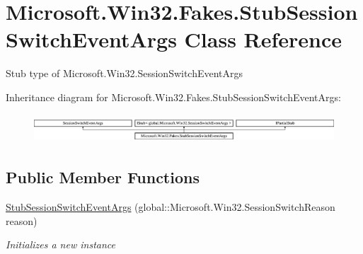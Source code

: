 \hypertarget{class_microsoft_1_1_win32_1_1_fakes_1_1_stub_session_switch_event_args}{\section{Microsoft.\-Win32.\-Fakes.\-Stub\-Session\-Switch\-Event\-Args Class Reference}
\label{class_microsoft_1_1_win32_1_1_fakes_1_1_stub_session_switch_event_args}
}


Stub type of Microsoft.\-Win32.\-Session\-Switch\-Event\-Args 


Inheritance diagram for Microsoft.\-Win32.\-Fakes.\-Stub\-Session\-Switch\-Event\-Args\-:\begin{figure}[H]
\begin{center}
\leavevmode
\includegraphics[height=1.078998cm]{class_microsoft_1_1_win32_1_1_fakes_1_1_stub_session_switch_event_args}
\end{center}
\end{figure}
\subsection*{Public Member Functions}
\begin{DoxyCompactItemize}
\item 
\hyperlink{class_microsoft_1_1_win32_1_1_fakes_1_1_stub_session_switch_event_args_a4dbfaeb36b3eb41520e931ca9b511d13}{Stub\-Session\-Switch\-Event\-Args} (global\-::\-Microsoft.\-Win32.\-Session\-Switch\-Reason reason)
\begin{DoxyCompactList}\small\item\em Initializes a new instance\end{DoxyCompactList}\end{DoxyCompactItemize}
